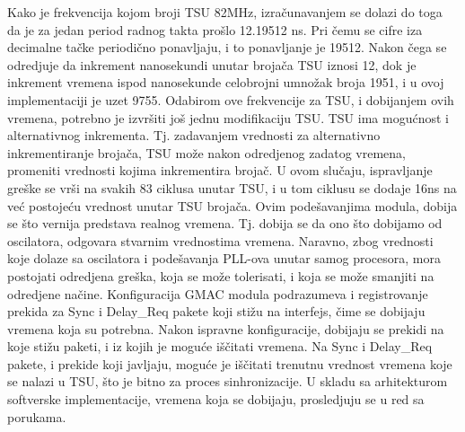 \documentclass[a4paper,12pt, master]{etf}
\begin{document}
	Kako je frekvencija kojom broji TSU 82MHz, izra\v{c}unavanjem se dolazi do
	toga da je za jedan period radnog takta pro\v{s}lo 12.19512 ns. Pri \v{c}emu
    se cifre iza decimalne ta\v{c}ke periodi\v{c}no ponavljaju,  i to
    ponavljanje je 19512. Nakon \v{c}ega se odredjuje da inkrement nanosekundi
    unutar broja\v{c}a TSU iznosi 12, dok je inkrement vremena ispod nanosekunde
	celobrojni umno\v{z}ak broja 1951, i u ovoj implementaciji je uzet 9755.
	Odabirom ove frekvencije za TSU, i dobijanjem ovih vremena,
	potrebno je izvr\v{s}iti jo\v{s} jednu modifikaciju TSU\@. TSU ima
	mogu\'{c}nost i alternativnog inkrementa. Tj\@. zadavanjem vrednosti za
	alternativno inkrementiranje broja\v{c}a, TSU mo\v{z}e nakon odredjenog
	zadatog vremena, promeniti vrednosti kojima inkrementira broja\v{c}. U ovom
	slu\v{c}aju, ispravljanje gre\v{s}ke se vr\v{s}i na svakih 83 ciklusa
	unutar TSU, i u tom ciklusu se dodaje 16ns na ve\'{c} postoje\'{c}u
	vrednost unutar TSU broja\v{c}a. Ovim pode\v{s}avanjima modula, dobija se
	\v{s}to vernija predstava realnog vremena. Tj\@. dobija se da ono \v{s}to
	dobijamo od oscilatora, odgovara stvarnim vrednostima vremena. Naravno,
	zbog vrednosti koje dolaze sa oscilatora i pode\v{s}avanja PLL-ova unutar
	samog procesora, mora postojati odredjena gre\v{s}ka, koja se mo\v{z}e
	tolerisati, i koja se mo\v{z}e smanjiti na odredjene na\v{c}ine.
	Konfiguracija GMAC modula podrazumeva i registrovanje prekida za Sync i
	Delay\_Req pakete koji sti\v{z}u na interfejs, \v{c}ime se dobijaju vremena
	koja su potrebna. Nakon ispravne konfiguracije, dobijaju se prekidi na koje
	sti\v{z}u paketi, i iz kojih je mogu\'{c}e i\v{s}\v{c}itati vremena. Na
	Sync i Delay\_Req pakete, i prekide koji javljaju, mogu\'{c}e je
	i\v{s}\v{c}itati trenutnu vrednost vremena koje se nalazi u TSU, \v{s}to je
	bitno za proces sinhronizacije. U skladu sa arhitekturom softverske
	implementacije, vremena koja se dobijaju, prosledjuju se u red sa porukama.
\end{document}

